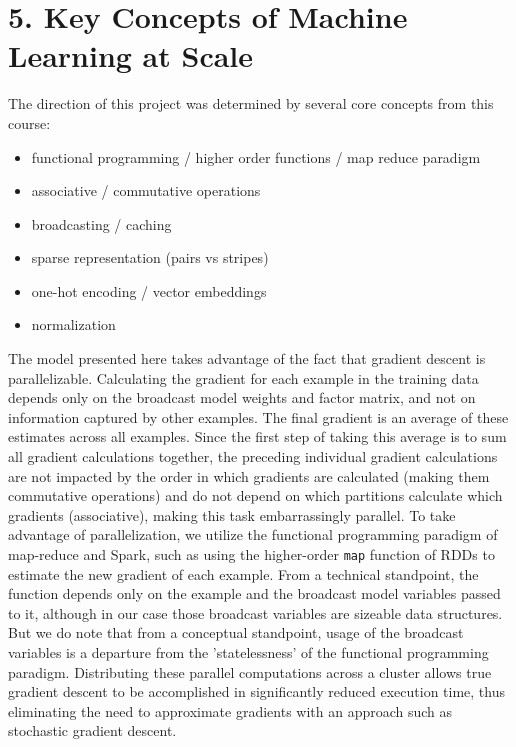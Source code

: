 \documentclass[11pt]{article}
\providecommand{\tightlist}{%
      \setlength{\itemsep}{0pt}\setlength{\parskip}{0pt}}
\begin{document}
    

    \section{5. Key Concepts of Machine Learning at
Scale}\label{key-concepts-of-machine-learning-at-scale}

The direction of this project was determined by several core concepts
from this course:

\begin{itemize}
\tightlist
\item
  functional programming / higher order functions / map reduce paradigm
\item
  associative / commutative operations
\item
  broadcasting / caching
\item
  sparse representation (pairs vs stripes)
\item
  one-hot encoding / vector embeddings
\item
  normalization
\end{itemize}

The model presented here takes advantage of the fact that gradient
descent is parallelizable. Calculating the gradient for each example in
the training data depends only on the broadcast model weights and factor
matrix, and not on information captured by other examples. The final
gradient is an average of these estimates across all examples. Since the
first step of taking this average is to sum all gradient calculations
together, the preceding individual gradient calculations are not
impacted by the order in which gradients are calculated (making them
commutative operations) and do not depend on which partitions calculate
which gradients (associative), making this task embarrassingly parallel.
To take advantage of parallelization, we utilize the functional
programming paradigm of map-reduce and Spark, such as using the
higher-order \texttt{map} function of RDDs to estimate the new gradient
of each example. From a technical standpoint, the function depends only
on the example and the broadcast model variables passed to it, although
in our case those broadcast variables are sizeable data structures. But
we do note that from a conceptual standpoint, usage of the broadcast
variables is a departure from the 'statelessness' of the functional
programming paradigm. Distributing these parallel computations across a
cluster allows true gradient descent to be accomplished in significantly
reduced execution time, thus eliminating the need to approximate
gradients with an approach such as stochastic gradient descent.
\end{document}
